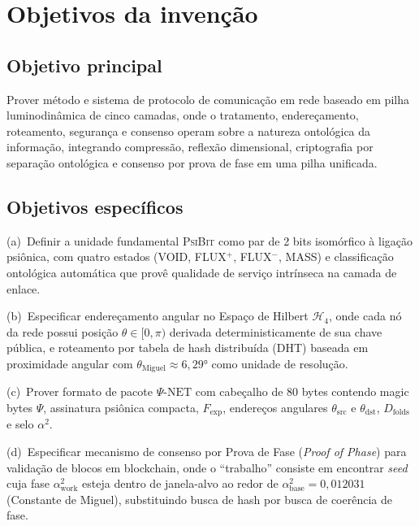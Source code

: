 \documentclass[12pt,a4paper]{article}
\newcommand{\alphaii}{\alpha^2}
\newcommand{\Dfolds}{D_{\text{folds}}}
\newcommand{\Fexp}{F_{\text{exp}}}
\newcommand{\thetaM}{\theta_{\text{Miguel}}}
\newcommand{\Hfour}{\mathcal{H}_4}
\newcommand{\PsiBit}{\textsc{PsiBit}}
\newcommand{\PsiNet}{\Psi\text{-NET}}
\begin{document}
\newpage
\section{Objetivos da invenção}

\subsection{Objetivo principal}

Prover método e sistema de protocolo de comunicação em rede
baseado em pilha luminodinâmica de cinco camadas, onde o
tratamento, endereçamento, roteamento, segurança e consenso
operam sobre a natureza ontológica da informação, integrando
compressão, reflexão dimensional, criptografia por separação
ontológica e consenso por prova de fase em uma pilha unificada.

\subsection{Objetivos específicos}

(a)~Definir a unidade fundamental \PsiBit{} como par de 2 bits
isomórfico à ligação psiônica, com quatro estados (VOID,
FLUX$^+$, FLUX$^-$, MASS) e classificação ontológica automática
que provê qualidade de serviço intrínseca na camada de enlace.

(b)~Especificar endereçamento angular no Espaço de Hilbert
$\Hfour$, onde cada nó da rede possui posição $\theta \in
[0, \pi)$ derivada deterministicamente de sua chave pública,
e roteamento por tabela de hash distribuída (DHT) baseada em
proximidade angular com $\thetaM \approx 6{,}29°$ como unidade
de resolução.

(c)~Prover formato de pacote $\PsiNet$ com cabeçalho de 80
bytes contendo magic bytes $\Psi$, assinatura psiônica
compacta, $\Fexp$, endereços angulares $\theta_{\text{src}}$ e
$\theta_{\text{dst}}$, $\Dfolds$ e selo $\alphaii$.

(d)~Especificar mecanismo de consenso por Prova de Fase
(\textit{Proof of Phase}) para validação de blocos em
blockchain, onde o ``trabalho'' consiste em encontrar
\textit{seed} cuja fase $\alphaii_{\text{work}}$ esteja dentro
de janela-alvo ao redor de $\alphaii_{\text{base}} = 0{,}012031$
(Constante de Miguel), substituindo busca de hash por busca de
coerência de fase.
\end{document}
